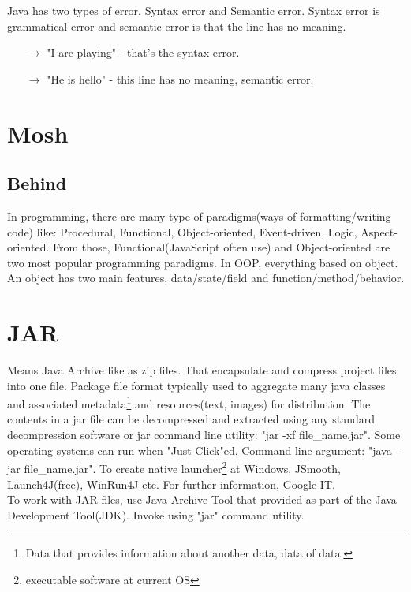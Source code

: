 \documentclass[10 pt]{article}
\begin{document}
Java has two types of error. Syntax error and Semantic error. Syntax error is grammatical error and semantic error is that the line has no meaning.
\begin{itemize}
	\item[$\rightarrow$] "I are playing" - that's the syntax error.
	\item[$\rightarrow$] "He is hello" - this line has no meaning, semantic error.
\end{itemize}

\section{Mosh}
\subsection{Behind}
In programming, there are many type of paradigms(ways of formatting/writing code) like: Procedural, Functional, Object-oriented, Event-driven, Logic, Aspect-oriented. From those, Functional(JavaScript often use) and Object-oriented are two most popular programming paradigms. In OOP, everything based on object. An object has two main features, data/state/field and function/method/behavior.

\section{JAR}
Means Java Archive like as zip files. That encapsulate and compress project files into one file. Package file format typically used to aggregate many java classes and associated metadata\footnote{Data that provides information about another data, data of data.} and resources(text, images) for distribution. The contents in a jar file can be decompressed and extracted using any standard decompression software or jar command line utility: "jar -xf file\_name.jar". Some operating systems can run when "Just Click"ed. Command line argument: "java -jar file\_name.jar". To create native launcher\footnote{executable software at current OS} at Windows, JSmooth, Launch4J(free), WinRun4J etc. For further information, Google IT. \\
To work with JAR files, use Java Archive Tool that provided as part of the Java Development Tool(JDK). Invoke using "jar" command utility.
\end{document}

